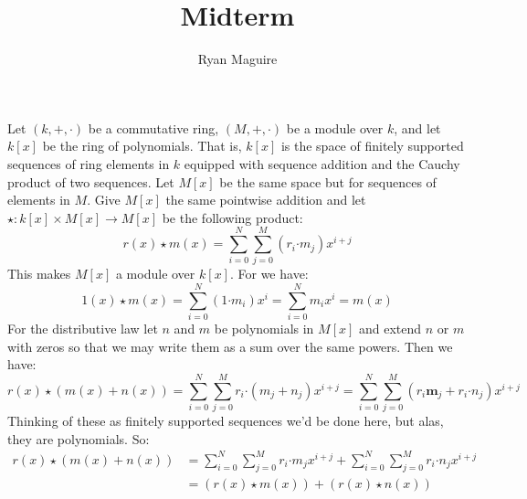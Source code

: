 \documentclass[crop=false,class=article]{standalone}                           %
\begin{document}
    \title{Midterm}
    \author{Ryan Maguire}
    \date{\vspace{-5ex}}
    \maketitle
    \section{}
        Let $(k,+,\cdot)$ be a commutative ring,
        $(M,\boldsymbol{+},\boldsymbol{\cdot})$ be a module over $k$, and let
        $k[x]$ be the ring of polynomials. That is, $k[x]$ is the space of
        finitely supported sequences of ring elements in $k$ equipped with
        sequence addition and the Cauchy product of two sequences. Let $M[x]$ be
        the same space but for sequences of elements in $M$. Give $M[x]$ the
        same pointwise addition and let $\star:k[x]\times{M}[x]\rightarrow{M}[x]$
        be the following product:
        \begin{equation}
            r(x)\star{m}(x)=
            \sum_{i=0}^{N}\sum_{j=0}^{M}(r_{i}\boldsymbol{\cdot}m_{j})x^{i+j}
        \end{equation}
        This makes $M[x]$ a module over $k[x]$. For we have:
        \begin{equation}
            1(x)\star{m}(x)=\sum_{i=0}^{N}(1\boldsymbol{\cdot}m_{i})x^{i}
            =\sum_{i=0}^{N}m_{i}x^{i}
            =m(x)
        \end{equation}
        For the distributive law let $n$ and $m$ be polynomials in $M[x]$ and
        extend $n$ or $m$ with zeros so that we may write them as a sum over the
        same powers. Then we have:
        \begin{equation}
            r(x)\star(m(x)+n(x))=
            \sum_{i=0}^{N}\sum_{j=0}^{M}r_{i}\boldsymbol{\cdot}(m_{j}+n_{j})x^{i+j}
            =\sum_{i=0}^{N}\sum_{j=0}^{M}
                (r_{i}\boldsymbol{m}_{j}+r_{i}\boldsymbol{\cdot}n_{j})x^{i+j}
        \end{equation}
        Thinking of these as finitely supported sequences we'd be done here, but
        alas, they are polynomials. So:
        \begin{subequations}
            \begin{align}
                r(x)\star(m(x)+n(x))
                &=\sum_{i=0}^{N}\sum_{j=0}^{M}r_{i}\boldsymbol{\cdot}m_{j}x^{i+j}
                    +\sum_{i=0}^{N}\sum_{j=0}^{M}
                    r_{i}\boldsymbol{\cdot}n_{j}x^{i+j}\\
                &=(r(x)\star{m}(x))+(r(x)\star{n}(x))
            \end{align}
        \end{subequations}
\end{document}
